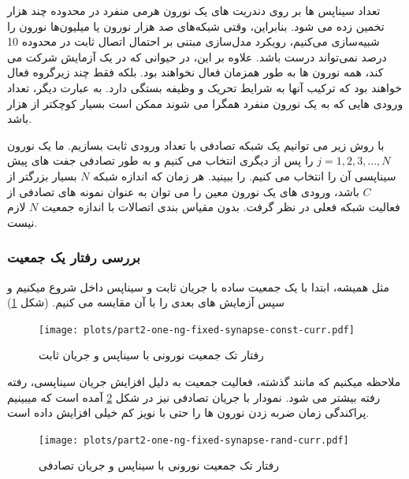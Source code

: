         تعداد سیناپس ها بر روی دندریت های یک نورون هرمی منفرد در محدوده چند هزار تخمین زده می شود. بنابراین، وقتی شبکه‌های صد هزار نورون یا میلیون‌ها نورون را شبیه‌سازی می‌کنیم، رویکرد مدل‌سازی مبتنی بر احتمال اتصال ثابت در محدوده 10 درصد نمی‌تواند درست باشد. علاوه بر این، در حیوانی که در یک آزمایش شرکت می کند، همه نورون ها به طور همزمان فعال نخواهند بود. بلکه فقط چند زیرگروه فعال خواهند بود که ترکیب آنها به شرایط تحریک و وظیفه بستگی دارد. به عبارت دیگر، تعداد ورودی هایی که به یک نورون منفرد همگرا می شوند ممکن است بسیار کوچکتر از هزار باشد.

        با روش زیر می توانیم یک شبکه تصادفی با تعداد ورودی ثابت بسازیم. ما یک نورون  
        $j=1,2,3,...,N$
        را پس از دیگری انتخاب می کنیم و به طور تصادفی جفت های پیش سیناپسی آن را انتخاب می کنیم.
        را ببینید. هر زمان که اندازه شبکه 
        $N$
        بسیار بزرگتر از 
        $C$ 
        باشد، ورودی های یک نورون معین را می توان به عنوان نمونه های تصادفی از فعالیت شبکه فعلی در نظر گرفت. بدون مقیاس بندی اتصالات با اندازه جمعیت 
        $N$ 
        لازم نیست. \cite{Neuronal-Dynamics}

        \subsubsection*{بررسی رفتار یک جمعیت}
            مثل همیشه، ابتدا با یک جمعیت ساده با جریان ثابت و سیناپس داخل شروع میکنیم و سپس آزمایش های بعدی را با آن مقایسه می کنیم.
            (شکل \ref{fig:part2-one-ng-fixed-synapse-const-curr})
            \begin{figure}[!ht]
                \centering
                \texttt{[image: plots/part2-one-ng-fixed-synapse-const-curr.pdf]} 
                \caption{رفتار تک جمعیت نورونی با سیناپس و جریان ثابت}
                \label{fig:part2-one-ng-fixed-synapse-const-curr}
            \end{figure}
            ملاحظه میکنیم که مانند گذشته، فعالیت جمعیت به دلیل افزایش جریان سیناپسی، رفته رفته بیشتر می شود. نمودار با جریان تصادفی نیز در شکل
            \ref{fig:part2-one-ng-fixed-synapse-rand-curr}
            آمده است که میبینیم پراکندگی زمان ضربه زدن نورون ها را حتی با نویز کم خیلی افزایش داده است.
            \begin{figure}[!ht]
                \centering
                \texttt{[image: plots/part2-one-ng-fixed-synapse-rand-curr.pdf]} 
                \caption{رفتار تک جمعیت نورونی با سیناپس و جریان تصادفی}
                \label{fig:part2-one-ng-fixed-synapse-rand-curr}
            \end{figure}

